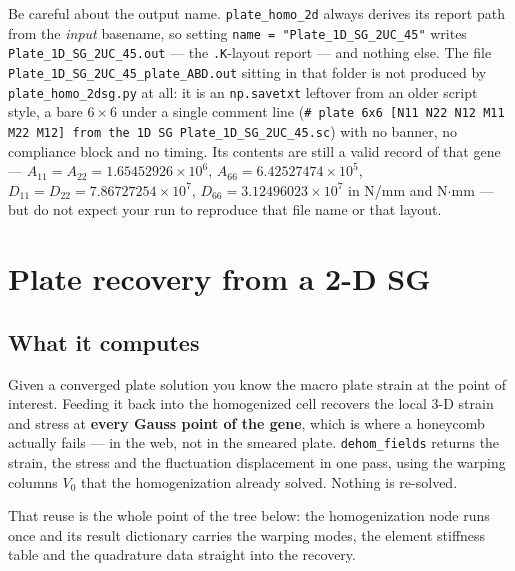 Be careful about the output name. \texttt{plate\_homo\_2d} always derives its
report path from the \emph{input} basename, so setting
\texttt{name = "Plate\_1D\_SG\_2UC\_45"} writes
\texttt{Plate\_1D\_SG\_2UC\_45.out} --- the \texttt{.K}-layout report --- and
nothing else. The file \texttt{Plate\_1D\_SG\_2UC\_45\_plate\_ABD.out} sitting
in that folder is not produced by \texttt{plate\_homo\_2dsg.py} at all: it is an
\texttt{np.savetxt} leftover from an older script style, a bare $6\times6$ under
a single comment line (\texttt{\# plate 6x6 [N11 N22 N12 M11 M22 M12] from the
1D SG Plate\_1D\_SG\_2UC\_45.sc}) with no banner, no compliance block and no
timing. Its contents are still a valid record of that gene ---
$A_{11} = A_{22} = 1.65452926\times10^{6}$,
$A_{66} = 6.42527474\times10^{5}$,
$D_{11} = D_{22} = 7.86727254\times10^{7}$,
$D_{66} = 3.12496023\times10^{7}$ in N/mm and N$\cdot$mm --- but do not expect
your run to reproduce that file name or that layout.

\section{Plate recovery from a 2-D SG}
\label{sec:solid-platedehom2d}

\subsection{What it computes}

Given a converged plate solution you know the macro plate strain at the point of
interest. Feeding it back into the homogenized cell recovers the local 3-D
strain and stress at \textbf{every Gauss point of the gene}, which is where a
honeycomb actually fails --- in the web, not in the smeared plate.
\texttt{dehom\_fields} returns the strain, the stress and the fluctuation
displacement in one pass, using the warping columns $V_0$ that the
homogenization already solved. Nothing is re-solved.

That reuse is the whole point of the tree below: the homogenization node runs
once and its result dictionary carries the warping modes, the element stiffness
table and the quadrature data straight into the recovery.

